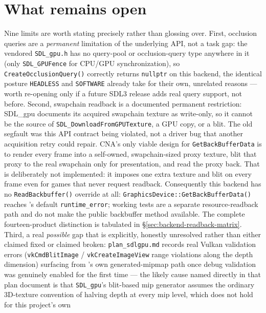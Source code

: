 \section{What remains open}
\label{sec:sdlgpu-what-remains-open}

Nine limits are worth stating precisely rather than glossing over. First, occlusion queries are a
\emph{permanent} limitation of the underlying API, not a task gap: the vendored
\texttt{SDL\_gpu.h} has no query-pool or occlusion-query type anywhere in it (only
\texttt{SDL\_GPUFence} for CPU/GPU synchronization), so \texttt{CreateOcclusionQuery()}
correctly returns \texttt{nullptr} on this backend, the identical posture \texttt{HEADLESS} and
\texttt{SOFTWARE} already take for their own, unrelated reasons --- worth re-opening only if a
future SDL3 release adds real query support, not before. Second, swapchain readback is a
documented permanent restriction: SDL\_gpu documents its acquired swapchain texture as write-only, so it
cannot be the source of \texttt{SDL\_DownloadFromGPUTexture}, a GPU copy, or a blit. The old
segfault was this API contract being violated, not a driver bug that another acquisition retry
could repair. CNA's only viable design for \texttt{GetBackBufferData} is to render every frame
into a self-owned, swapchain-sized proxy texture, blit that proxy to the real swapchain only for
presentation, and read the proxy back. That is deliberately not implemented: it imposes one
extra texture and blit on every frame even for games that never request readback. Consequently
this backend has no \texttt{ReadBackbuffer()} override at all:
\texttt{GraphicsDevice::GetBackBuffer\allowbreak Data()} reaches
's default \texttt{runtime\_error}; working
 tests are a separate resource-readback path and do not
make the public backbuffer method available. The complete fourteen-product distinction is
tabulated in \S\ref{sec:backend-readback-matrix}. Third, a real
\emph{possible} gap that is explicitly, honestly unresolved rather than
either claimed fixed or claimed broken: \texttt{plan\_sdlgpu.md} records real Vulkan validation
errors (\texttt{vkCmdBlitImage} / \texttt{vkCreateImageView} range violations along the depth
dimension) surfacing from 's own generated-mipmap path once debug validation
was genuinely enabled for the first time --- the likely cause named directly in that plan
document is that \texttt{SDL\_gpu}'s blit-based mip generator assumes the ordinary 3D-texture
convention of halving depth at every mip level, which does not hold for this project's own
